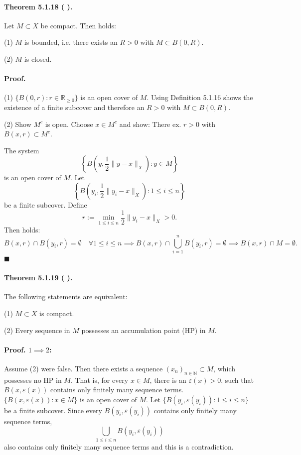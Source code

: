 \documentclass[12pt]{article}
\newcommand{\N}{\mathbb{N}}
\newcommand{\R}{\mathbb{R}}
\newcommand{\eps}{\varepsilon}
\newcommand{\NumberedTheorem}[3]{%
\paragraph*{Theorem #1 ( #2 ).} #3\par}
\begin{document}
\NumberedTheorem{5.1.18}{}{Let $M \subset X$ be compact. Then holds:
\par\medskip
(1) $M$ is bounded, i.e. there exists an $R > 0$ with $M \subset B(0, R)$.
\par\medskip
(2) $M$ is closed.
}

\paragraph*{Proof.}
(1) $\{B(0, r) : r \in \R_{\ge 0}\}$ is an open cover of $M$. Using Definition 5.1.16 shows the existence of a finite subcover and therefore an $R > 0$ with $M \subset B(0, R)$.
\par
(2) Show $M^c$ is open. Choose $x \in M^c$ and show: There ex. $r > 0$ with $B(x, r) \subset M^c$.
\par
The system
\[
\left\{ B\left(y, \frac{1}{2}\|y - x\|_X\right) : y \in M \right\}
\]
is an open cover of $M$. Let
\[
\left\{ B\left(y_i, \frac{1}{2}\|y_i - x\|_X\right) : 1 \le i \le n \right\}
\]
be a finite subcover. Define
\[
r := \min_{1 \le i \le n} \frac{1}{2} \|y_i - x\|_X > 0.
\]
Then holds:
\[
B(x, r) \cap B(y_i, r) = \emptyset \quad \forall 1 \le i \le n \implies B(x, r) \cap \bigcup_{i=1}^n B(y_i, r) = \emptyset \implies B(x, r) \cap M = \emptyset.
\]
\hfill $\blacksquare$

\NumberedTheorem{5.1.19}{}{The following statements are equivalent:
\par\medskip
(1) $M \subset X$ is compact.
\par\medskip
(2) Every sequence in $M$ possesses an accumulation point (HP) in $M$.
}

\paragraph*{Proof. $1 \implies 2$:}
Assume (2) were false. Then there exists a sequence $(x_n)_{n \in \N} \subset M$, which possesses no HP in $M$. That is, for every $x \in M$, there is an $\eps(x) > 0$, such that $B(x, \eps(x))$ contains only finitely many sequence terms. $\{B(x, \eps(x)) : x \in M\}$ is an open cover of $M$. Let $\{B(y_i, \eps(y_i)) : 1 \le i \le n\}$ be a finite subcover. Since every $B(y_i, \eps(y_i))$ contains only finitely many sequence terms,
\[
\bigcup_{1 \le i \le n} B(y_i, \eps(y_i))
\]
also contains only finitely many sequence terms and this is a contradiction.
\end{document}
